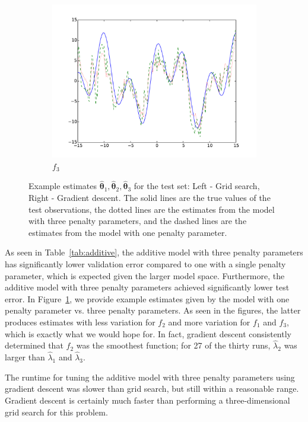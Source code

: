 \documentclass[12pt,letterpaper]{article}
\begin{document}
\begin{figure}
\begin{subfigure}[b]{0.5\textwidth}
\includegraphics[width=1.1\textwidth]  {train_gs_v_hc_f3_2.pdf}
\caption{$f_3$}
\end{subfigure}

\caption{Example estimates $\hat{\boldsymbol{\theta}}_1, \hat{\boldsymbol{\theta}}_2, \hat{\boldsymbol{\theta}}_3$ for the test set: Left - Grid search, Right - Gradient descent. The solid lines are the true values of the test observations, the dotted lines are the estimates from the model with three penalty parameters, and the dashed lines are the estimates from the model with one penalty parameter.}
\label{fig:additive_test}
\end{figure}

As seen in Table~\ref{tab:additive}, the additive model with three penalty parameters has significantly lower validation error compared to one with a single penalty parameter, which is expected given the larger model space. Furthermore, the additive model with three penalty parameters achieved significantly lower test error. In Figure~\ref{fig:additive_test}, we provide example estimates given by the model with one penalty parameter vs. three penalty parameters. As seen in the figures, the latter produces estimates with less variation for $f_2$ and more variation for $f_1$ and $f_3$, which is exactly what we would hope for. In fact, gradient descent consistently determined that $f_2$ was the smoothest function; for 27 of the thirty runs, $\hat{\lambda}_2$ was larger than $\hat{\lambda}_1$ and $\hat{\lambda}_3$.

The runtime for tuning the additive model with three penalty parameters using gradient descent was slower than grid search, but still within a reasonable range. Gradient descent is certainly much faster than performing a three-dimensional grid search for this problem.
\end{document}
